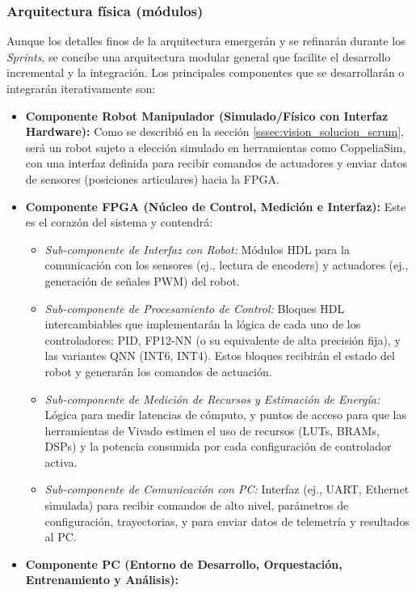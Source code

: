 \documentclass[12pt]{article}
\begin{document}
\subsubsection{Arquitectura física (módulos)}
\label{sssec:arquitectura_modular_scrum}

Aunque los detalles finos de la arquitectura emergerán y se refinarán durante los \textit{Sprints}, se concibe una arquitectura modular general que facilite el desarrollo incremental y la integración. Los principales componentes que se desarrollarán o integrarán iterativamente son:

\begin{itemize}
    \item \textbf{Componente Robot Manipulador (Simulado/Físico con Interfaz Hardware):} Como se describió en la sección \ref{sssec:vision_solucion_scrum}, será un robot sujeto a elección simulado en herramientas como CoppeliaSim, con una interfaz definida para recibir comandos de actuadores y enviar datos de sensores (posiciones articulares) hacia la FPGA.
    \item \textbf{Componente FPGA (Núcleo de Control, Medición e Interfaz):} Este es el corazón del sistema y contendrá:
        \begin{itemize}
            \item \textit{Sub-componente de Interfaz con Robot:} Módulos HDL para la comunicación con los sensores (ej., lectura de encoders) y actuadores (ej., generación de señales PWM) del robot.
            \item \textit{Sub-componente de Procesamiento de Control:} Bloques HDL intercambiables que implementarán la lógica de cada uno de los controladores: PID, FP12-NN (o su equivalente de alta precisión fija), y las variantes QNN (INT6, INT4). Estos bloques recibirán el estado del robot y generarán los comandos de actuación.
            \item \textit{Sub-componente de Medición de Recursos y Estimación de Energía:} Lógica para medir latencias de cómputo, y puntos de acceso para que las herramientas de Vivado estimen el uso de recursos (LUTs, BRAMs, DSPs) y la potencia consumida por cada configuración de controlador activa.
            \item \textit{Sub-componente de Comunicación con PC:} Interfaz (ej., UART, Ethernet simulada) para recibir comandos de alto nivel, parámetros de configuración, trayectorias, y para enviar datos de telemetría y resultados al PC.
        \end{itemize}
    \item \textbf{Componente PC (Entorno de Desarrollo, Orquestación, Entrenamiento y Análisis):}

\end{itemize}
\end{document}
